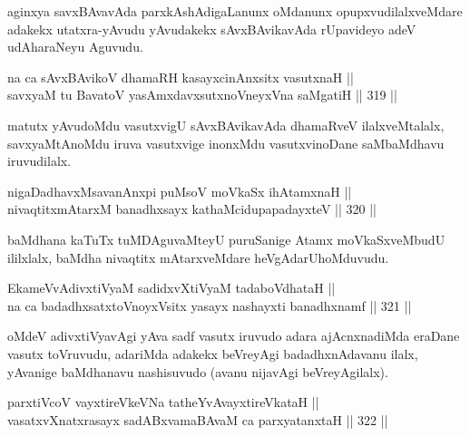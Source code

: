 \begin{artha}
aginxya savxBAvavAda parxkAshAdigaLanunx oMdanunx
opupxvudilalxveMdare adakekx utatxra-yAvudu yAvudakekx sAvxBAvikavAda
rUpavideyo adeV udAharaNeyu Aguvudu.
\end{artha}

\begin{shl}
na ca sAvxBAvikoV dhamaRH kasayxcinAnxsitx vasutxnaH || \\
savxyaM tu BavatoV yasAmxdavxsutxnoV\s neyxVna saMgatiH \hfill || 319 ||  
\end{shl}

\begin{artha}
matutx yAvudoMdu vasutxvigU sAvxBAvikavAda dhamaRveV ilalxveMtalalx,
savxyaMtAnoMdu iruva vasutxvige inonxMdu vasutxvinoDane saMbaMdhavu
iruvudilalx.
\end{artha}

\begin{shl}
nigaDadhavxMsavanAnxpi puMsoV moVkaSx ihA\s \s tamxnaH ||  \\
nivaqtitxmAtarxM banadhxsayx kathaMcidupapadayxteV \hfill || 320 ||  
\end{shl}

\begin{artha}
baMdhana kaTuTx tuMDAguvaMteyU puruSanige Atamx moVkaSxveMbudU
ililxlalx, baMdha nivaqtitx mAtarxveMdare heVgAdarU\break hoMduvudu.
\end{artha}

\begin{shl}
EkameVvAdivxtiVyaM sadidxvXtiVyaM tadaboVdhataH || \\
na ca badadhxsatxtoV\s noyxV\s sitx yasayx nashayxti banadhxnamf \hfill || 321 ||  
\end{shl}

\begin{artha}
oMdeV adivxtiVyavAgi yAva sadf vasutx iruvudo adara ajAcnxnadiMda
eraDane vasutx toVruvudu, adariMda adakekx beVreyAgi badadhxnAdavanu
ilalx, yAvanige baMdhanavu nashisuvudo (avanu nijavAgi beVreyAgilalx).
\end{artha}


\begin{shl}
parxtiVcoV vayxtireVkeVNa tatheYvAvayxtireVkataH || \\
vasatxvXnatxrasayx sadABxvamaBAvaM ca parxyatanxtaH \hfill || 322 ||  
\end{shl}

